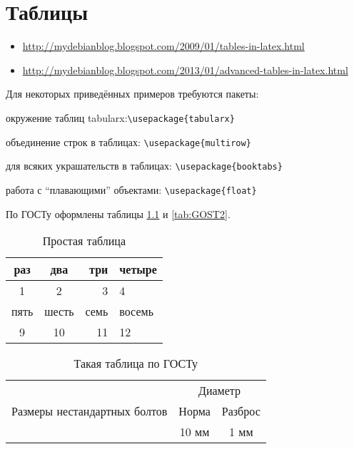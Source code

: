 \chapter{Таблицы}\label{ch:tab}
\begin{itemize}
	\item 	\href{http://mydebianblog.blogspot.com/2009/01/tables-in-latex.html}{http://mydebianblog.blogspot.com/2009/01/tables-in-latex.html}
	
	\item 	\href{http://mydebianblog.blogspot.com/2013/01/advanced-tables-in-latex.html}{http://mydebianblog.blogspot.com/2013/01/advanced-tables-in-latex.html} 
\end{itemize}

Для некоторых приведённых примеров требуются пакеты:

окружение таблиц tabularx:\verb|\usepackage{tabularx}|

объединение строк в таблицах:
\verb|\usepackage{multirow}|

для всяких украшательств в таблицах:
\verb|\usepackage{booktabs}|

работа с ``плавающими'' объектами:
\verb|\usepackage{float}|


По ГОСТу оформлены таблицы \ref{tab:GOST1} и \ref{tab:GOST2}.


\begin{table}[ht]
	\caption{Простая таблица}
	\begin{tabular}{|c|c|r|l|}
		\hline
		раз & два & три & четыре \\
		\hline
		1 & 2 & 3 & 4 \\
		\hline
		пять & шесть & семь & восемь \\
		\hline
		9 & 10 & 11 & 12 \\
		\hline
	\end{tabular}
\end{table}


\begin{table}[H]
		\caption{Такая таблица по ГОСТу}
		\label{tab:GOST1}
	\begin{center}
		\begin{tabular}{|c|c|c|}
			\hline
			\multirow{3}{*}{Размеры нестандартных болтов} & \multicolumn{2}{c|}{Диаметр} \\
			\cline{2-3}
			& Норма & Разброс \\
			\cline{2-3}
			& 10 мм & 1 мм \\
			\hline
		\end{tabular}
	\end{center}
\end{table}

